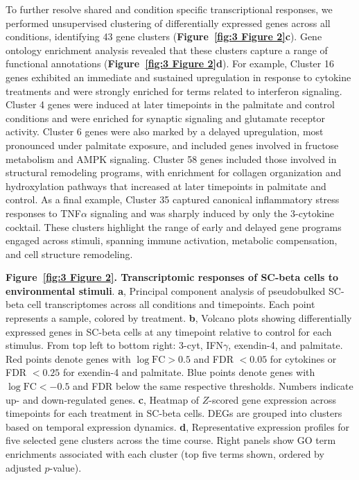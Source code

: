 To further resolve shared and condition specific transcriptional responses, we performed unsupervised clustering of differentially expressed genes across all conditions, identifying 43 gene clusters (\textbf{Figure~\ref{fig:3 Figure 2}\textbf{c}}). Gene ontology enrichment analysis revealed that these clusters capture a range of functional annotations (\textbf{Figure~\ref{fig:3 Figure 2}\textbf{d}}). For example, Cluster 16 genes exhibited an immediate and sustained upregulation in response to cytokine treatments and were strongly enriched for terms related to interferon signaling. Cluster 4 genes were induced at later timepoints in the palmitate and control conditions and were enriched for synaptic signaling and glutamate receptor activity. Cluster 6 genes were also marked by a delayed upregulation, most pronounced under palmitate exposure, and included genes involved in fructose metabolism and AMPK signaling. Cluster 58 genes included those involved in structural remodeling programs, with enrichment for collagen organization and hydroxylation pathways that increased at later timepoints in palmitate and control. As a final example, Cluster 35 captured canonical inflammatory stress responses to TNF$\alpha$ signaling and was sharply induced by only the 3-cytokine cocktail. These clusters highlight the range of early and delayed gene programs engaged across stimuli, spanning immune activation, metabolic compensation, and cell structure remodeling.

\clearpage

\thispagestyle{plain}
\noindent
\textbf{Figure~\ref{fig:3 Figure 2}. Transcriptomic responses of SC-beta cells to environmental stimuli}. \textbf{a}, Principal component analysis of pseudobulked SC-beta cell transcriptomes across all conditions and timepoints. Each point represents a sample, colored by treatment. \textbf{b}, Volcano plots showing differentially expressed genes in SC-beta cells at any timepoint relative to control for each stimulus. From top left to bottom right: 3-cyt, IFN$\gamma$, exendin-4, and palmitate. Red points denote genes with $\log\mathrm{FC} > 0.5$ and FDR $< 0.05$ for cytokines or FDR $< 0.25$ for exendin-4 and palmitate. Blue points denote genes with $\log\mathrm{FC} < -0.5$ and FDR below the same respective thresholds. Numbers indicate up- and down-regulated genes. \textbf{c}, Heatmap of $Z$-scored gene expression across timepoints for each treatment in SC-beta cells. DEGs are grouped into clusters based on temporal expression dynamics. \textbf{d}, Representative expression profiles for five selected gene clusters across the time course. Right panels show GO term enrichments associated with each cluster (top five terms shown, ordered by adjusted $p$-value).

